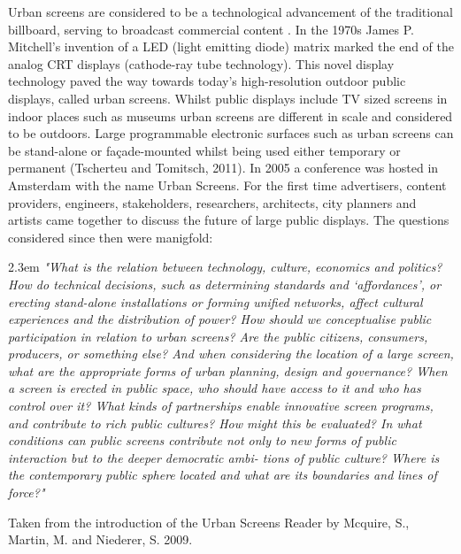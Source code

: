 Urban screens are considered to be a technological advancement of the traditional billboard, serving to broadcast commercial content \cite{Huhtamo2009}. 
In the 1970s James P. Mitchell's invention of a LED (light emitting diode) matrix marked the end of the analog CRT displays (cathode-ray tube technology). This novel display technology paved the way towards today's high-resolution outdoor public displays, called urban screens.
Whilst public displays include TV sized screens in indoor places such as museums urban screens are different in scale and considered to be outdoors. 
Large programmable electronic surfaces such as urban screens can be stand-alone or façade-mounted whilst being used either temporary or permanent (Tscherteu and Tomitsch, 2011). 
In 2005 a conference was hosted in Amsterdam with the name Urban Screens. For the first time advertisers, content providers, engineers, stakeholders, researchers, architects, city planners and artists came together to discuss the future of large public displays. 
The questions considered since then were manigfold:


\begin{singlespace}
	\leftskip2.3em
		\rightskip\leftskip
\textit{\small "What is the relation between technology, culture, economics and politics? How do technical decisions, such as determining standards and ‘affordances’, or erecting stand-alone installations or forming unified networks, affect cultural experiences and the distribution of power? How should we conceptualise public participation in relation to urban screens? Are the public citizens, consumers, producers, or something else? And when considering the location of a large screen, what are the appropriate forms of urban planning, design and governance? When a screen is erected in public space, who should have access to it and who has control over it? What kinds of partnerships enable innovative screen programs, and contribute to rich public cultures? How might this be evaluated? In what conditions can public screens contribute not only to new forms of public interaction but to the deeper democratic ambi- tions of public culture? Where is the contemporary public sphere located and what are its boundaries and lines of force?"} 

\small Taken from the introduction of the Urban Screens Reader by Mcquire, S., Martin, M. and Niederer, S. 2009.
\end{singlespace}

